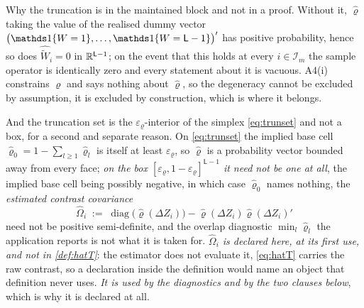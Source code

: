 Why the truncation is in the maintained block and not in a proof. Without it, $\hat\varrho$
taking the value of the realised dummy vector $\big(\un\{W=1\},\dots,\un\{W=\mathsf L-1\}\big)'$ has
positive probability, hence so does $\widehat{\widetilde W}_i=0$ in $\mathbb{R}^{\mathsf L-1}$; on the
event that this holds at every $i\in\mathcal I_m$ the sample operator is identically zero and every
statement about it is vacuous. A4(i) constrains $\varrho$ and says nothing about
$\hat\varrho$, so the degeneracy cannot be excluded by assumption, it is excluded by construction,
which is where it belongs.

And the truncation set is the $\varepsilon_\varrho$-interior of the simplex \eqref{eq:trunset} and
not a box, for a second and separate reason. On \eqref{eq:trunset} the implied base cell
$\hat\varrho_0=1-\sum_{l\ge1}\hat\varrho_l$ is itself at least $\varepsilon_\varrho$, so $\hat\varrho$ is
a probability vector bounded away from every face; \emph{on the box
$[\varepsilon_\varrho,1-\varepsilon_\varrho]^{\mathsf L-1}$ it need not be one at all}, the implied base
cell being possibly negative, in which case $\hat\varrho_0$ names nothing, the \emph{estimated contrast
covariance}
\[
\hat\Omega_i\;:=\;\operatorname{diag}\big(\hat\varrho(\Delta Z_i)\big)-\hat\varrho(\Delta Z_i)\hat\varrho(\Delta Z_i)'
\]
need not be
positive semi-definite, and the overlap diagnostic $\min_l\hat\varrho_l$ the application reports is not
what it is taken for. \emph{$\hat\Omega_i$ is declared here, at its first use, and not in
\cref{def:hatT}}: the estimator does not evaluate it, \eqref{eq:hatT} carries the raw contrast, so a
declaration inside the definition would name an object that definition never uses. \emph{It is used by
the diagnostics and by the two clauses below}, which is why it is declared at all.
